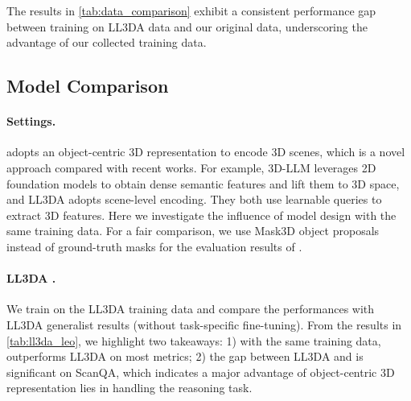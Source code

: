 \begin{table}[t!]
\centering
{}
\label{tab:data_comparison}
\end{table}

The results in \cref{tab:data_comparison} exhibit a consistent performance gap between training on LL3DA data and our original data, underscoring the advantage of our collected training data.

\subsection{Model Comparison}\label{sec:model_comparison}
\paragraph{Settings.} \agent adopts an object-centric 3D representation to encode 3D scenes, which is a novel approach compared with recent works. For example, 3D-LLM \citep{hong20233d} leverages 2D foundation models to obtain dense semantic features and lift them to 3D space, and LL3DA \citep{chen2024ll3da} adopts scene-level encoding. They both use learnable queries to extract 3D features. Here we investigate the influence of model design with the same training data. For a fair comparison, we use Mask3D \citep{schult2022mask3d} object proposals instead of ground-truth masks for the evaluation results of \agent.

\paragraph{LL3DA \vs \agent.} We train \agent on the LL3DA training data and compare the performances with LL3DA generalist results (without task-specific fine-tuning). From the results in \cref{tab:ll3da_leo}, we highlight two takeaways: 1) with the same training data, \agent outperforms LL3DA on most metrics; 2) the gap between LL3DA and \agent is significant on ScanQA, which indicates a major advantage of object-centric 3D representation lies in handling the reasoning task.

